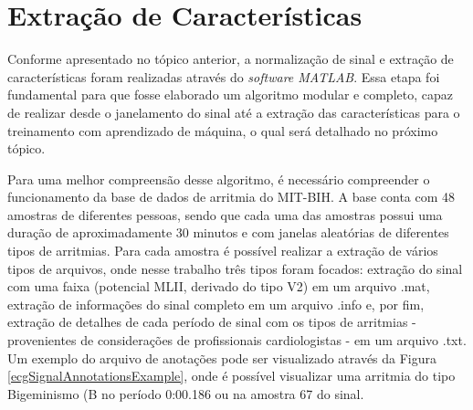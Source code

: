 \documentclass[conference]{IEEEtran}
\begin{document}

\section{Extração de Características}

Conforme apresentado no tópico anterior, a normalização de sinal e extração de características foram realizadas através do \textit{software MATLAB}. Essa etapa foi fundamental para que fosse elaborado um algoritmo modular e completo, capaz de realizar desde o janelamento do sinal até a extração das características para o treinamento com aprendizado de máquina, o qual será detalhado no próximo tópico.

Para uma melhor compreensão desse algoritmo, é necessário compreender o funcionamento da base de dados de arritmia do MIT-BIH. A base conta com 48 amostras de diferentes pessoas, sendo que cada uma das amostras possui uma duração de aproximadamente 30 minutos e com janelas aleatórias de diferentes tipos de arritmias. Para cada amostra é possível realizar a extração de vários tipos de arquivos, onde nesse trabalho três tipos foram focados: extração do sinal com uma faixa (potencial MLII, derivado do tipo V2) em um arquivo .mat, extração de informações do sinal completo em um arquivo .info e, por fim, extração de detalhes de cada período de sinal com os tipos de arritmias - provenientes de considerações de profissionais cardiologistas - em um arquivo .txt. Um exemplo do arquivo de anotações pode ser visualizado através da Figura \ref{ecgSignalAnnotationsExample}, onde é possível visualizar uma arritmia do tipo Bigeminismo (B no período 0:00.186 ou na amostra 67 do sinal.
\end{document}
